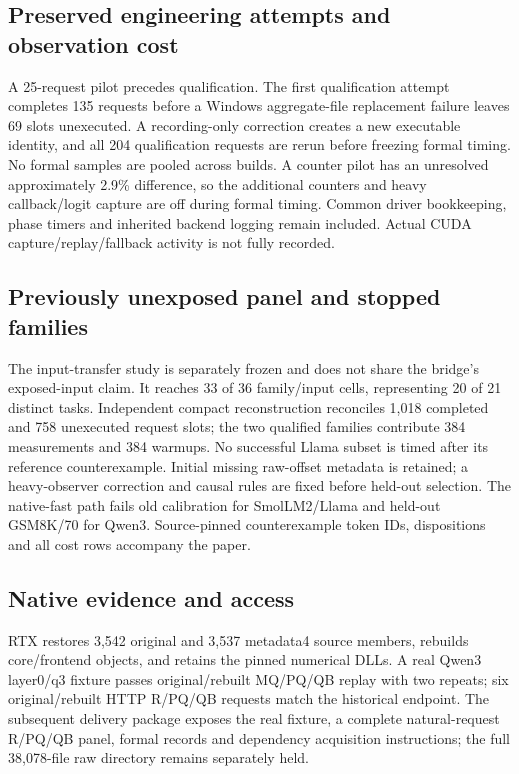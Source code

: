 \subsection{Preserved engineering attempts and observation cost}
A 25-request pilot precedes qualification. The first qualification attempt completes 135 requests before a Windows aggregate-file replacement failure leaves 69 slots unexecuted. A recording-only correction creates a new executable identity, and all 204 qualification requests are rerun before freezing formal timing. No formal samples are pooled across builds. A counter pilot has an unresolved approximately 2.9\% difference, so the additional counters and heavy callback/logit capture are off during formal timing. Common driver bookkeeping, phase timers and inherited backend logging remain included. Actual CUDA capture/replay/fallback activity is not fully recorded.

\subsection{Previously unexposed panel and stopped families}
The input-transfer study is separately frozen and does not share the bridge's exposed-input claim. It reaches 33 of 36 family/input cells, representing 20 of 21 distinct tasks. Independent compact reconstruction reconciles 1,018 completed and 758 unexecuted request slots; the two qualified families contribute 384 measurements and 384 warmups. No successful Llama subset is timed after its reference counterexample. Initial missing raw-offset metadata is retained; a heavy-observer correction and causal rules are fixed before held-out selection. The native-fast path fails old calibration for SmolLM2/Llama and held-out GSM8K/70 for Qwen3. Source-pinned counterexample token IDs, dispositions and all cost rows accompany the paper.

\subsection{Native evidence and access}
RTX restores 3,542 original and 3,537 metadata4 source members, rebuilds core/frontend objects, and retains the pinned numerical DLLs. A real Qwen3 layer0/q3 fixture passes original/rebuilt MQ/PQ/QB replay with two repeats; six original/rebuilt HTTP R/PQ/QB requests match the historical endpoint. The subsequent delivery package exposes the real fixture, a complete natural-request R/PQ/QB panel, formal records and dependency acquisition instructions; the full 38,078-file raw directory remains separately held.

